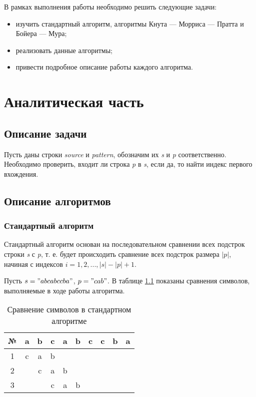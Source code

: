 \documentclass[a4paper,14pt]{extreport}
\begin{document}
В рамках выполнения работы необходимо решить следующие задачи:
\begin{itemize}
	\item изучить стандартный алгоритм, алгоритмы Кнута — Морриса — Пратта и Бойера — Мура;
	\item реализовать данные алгоритмы;
	\item привести подробное описание работы каждого алгоритма.
\end{itemize}


\chapter{Аналитическая часть}

\section{Описание задачи}

Пусть даны строки \textit{source} и \textit{pattern}, обозначим их \textit{s} и \textit{p} соответственно.
Необходимо проверить, входит ли строка \textit{p} в \textit{s}, если да, то найти индекс первого вхождения.

\section{Описание алгоритмов}

\subsection{Стандартный алгоритм}

Стандартный алгоритм основан на последовательном сравнении всех подстрок строки \textit{s} с \textit{p}, т. е. будет происходить сравнение всех подстрок размера $|p|$, начиная с индексов $i = 1,2,...,|s|-|p|+1$.

Пусть $s= "abcabccba"$, $p = "cab"$.
В таблице \ref{tbl:standard-analysis} показаны сравнения символов, выполняемые в ходе работы алгоритма.

\begin{table}[h]
	\begin{center}
		\begin{tabular}{|c|c|c|c|c|c|c|c|c|c|}
			\hline
			№&a&b&c&a&b&c&c&b&a\\
			\hline
			1&c&a&b& & & & & &\\
			\hline
			2& &c&a&b& & & & &\\
			\hline
			3& & &c&a&b& & & &\\
			\hline
		\end{tabular}
	\end{center}
	\caption{Сравнение символов в стандартном алгоритме}
	\label{tbl:standard-analysis}
\end{table}
\end{document}
